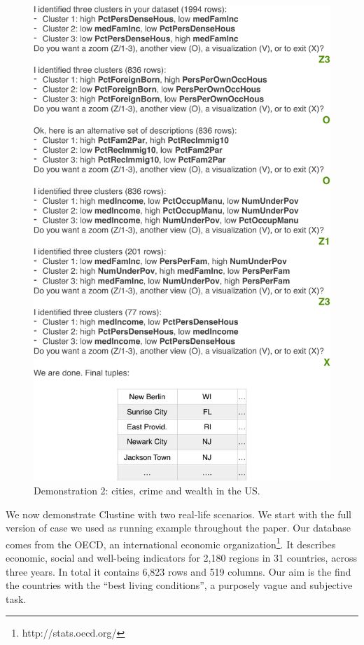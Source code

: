 \begin{figure}[t]
  \centering
  \includegraphics[width=\columnwidth]{Experiments/UseCase2}
  \caption{Demonstration 2: cities, crime and wealth in the US.}
  \label{fig:UseCase2}
\end{figure}

We now demonstrate Clustine with two real-life scenarios.  We start with the
full version of case we used as running example throughout the paper. Our
database comes from the OECD, an international economic
organization\footnote{http://stats.oecd.org/}. It describes economic, social
and well-being indicators for 2,180 regions in 31 countries, across three
years. In total it contains 6,823 rows and 519 columns. Our aim is the find the
countries with the ``best living conditions'', a purposely vague and subjective
task.

